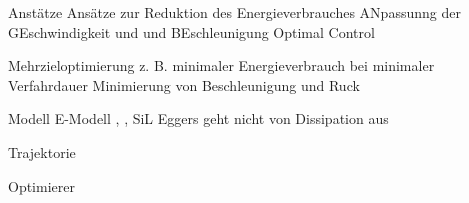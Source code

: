 Anstätze
Ansätze zur Reduktion des Energieverbrauches  \cite{Paryanto.2015} \cite{Pellicciari.2015} \cite{Carabin.2017}
ANpassunng der GEschwindigkeit und und BEschleunigung \cite[S.~57]{Eggers.2019}
Optimal Control \cite{Bjorkenstam.2013}

Mehrzieloptimierung z. B. minimaler Energieverbrauch bei minimaler Verfahrdauer \cite{Lin.2018} Minimierung von Beschleunigung und Ruck  \cite{Saravanan.2008}

Modell
E-Modell \cite{Pellicciari.2011}, \cite[S.~1]{Hansen.2012}, \cite{Ziaukas.2017}
SiL \cite[S-~56]{Eggers.2019} 
Eggers geht nicht von Dissipation aus

Trajektorie

Optimierer



















